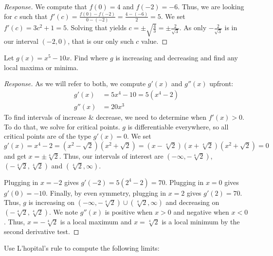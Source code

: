 \documentclass[11pt,fleqn]{exam}
\renewcommand{\d}[1]{\ensuremath{\operatorname{d}\!{#1}}}
\newcommand{\ddx}[1]{\frac{\d{}}{\d{#1}}}
\begin{document}
\begin{questions}
\begin{proof}[Response]
	We compute that $f(0)=4$ and $f(-2)=-6$. Thus, we are looking for $c$ such that $f'(c)=\frac{f(0)-f(-2)}{0-(-2)}=\frac{4-(-6)}{2}=5$. We set $f'(c)=3c^2+1=5$. Solving that yields $c=\pm \sqrt{\frac{4}{3}}=\pm\frac{2}{\sqrt{3}}$. As only $-\frac{2}{\sqrt{3}}$ is in our interval $(-2,0)$, that is our only such $c$ value.
\end{proof}

\newpage
\addpoints
\question[6] Let $g(x)=x^5-10x$. Find where $g$ is increasing and decreasing and find any local maxima or minima.
\begin{proof}[Response]
	As we will refer to both, we compute $g'(x)$ and $g''(x)$ upfront:
	\begin{align*}
		g'(x)&=5x^4-10=5(x^4-2)\\
		g''(x)&=20x^3
	\end{align*}
	To find intervals of increase \& decrease, we need to determine when $f'(x)>0$. To do that, we solve for critical points. $g$ is differentiable everywhere, so all critical points are of the type $g'(x)=0$. We set $g'(x)=x^4-2=(x^2-\sqrt{2})(x^2+\sqrt{2})=(x-\sqrt[4]{2})(x+\sqrt[4]{2})(x^2+\sqrt{2})=0$ and get $x=\pm \sqrt[4]{2}$. Thus, our intervals of interest are $(-\infty,-\sqrt[4]{2})$, $(-\sqrt[4]{2},\sqrt[4]{2})$ and $(\sqrt[4]{2},\infty)$. 
	
	Plugging in $x=-2$ gives $g'(-2)=5(2^4-2)=70$. Plugging in $x=0$ gives $g'(0)=-10$. Finally, by even symmetry, plugging in $x=2$ gives $g'(2)=70$. Thus, $g$ is increasing on $(-\infty,-\sqrt[4]{2})\cup(\sqrt[4]{2},\infty)$ and decreasing on $(-\sqrt[4]{2},\sqrt[4]{2})$. We note $g''(x)$ is positive when $x>0$ and negative when $x<0$. Thus, $x=-\sqrt[4]{2}$ is a local maximum and $x=\sqrt[4]{2}$ is a local minimum by the second derivative test.
\end{proof}\vspace{1em}
\question Use L'hopital's rule to compute the following limits:
\end{questions}
\end{document}
